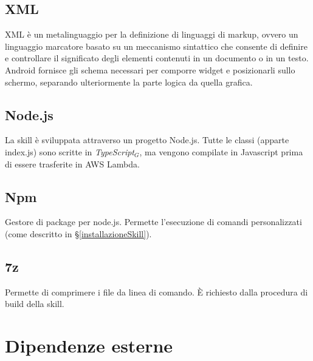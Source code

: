 \subsection{XML}
XML è un metalinguaggio per la definizione di linguaggi di markup, ovvero un linguaggio marcatore basato su un meccanismo sintattico che consente di definire e controllare il significato degli elementi contenuti in un documento o in un testo.\\ 
Android fornisce gli schema necessari per comporre widget e posizionarli sullo schermo, separando ulteriormente la parte logica da quella grafica. 

\subsection{Node.js}
La skill è sviluppata attraverso un progetto Node.js. Tutte le classi (apparte index.js) sono scritte in \textit{TypeScript$_{G}$}, ma vengono compilate in Javascript prima di essere trasferite in AWS Lambda.
\subsection{Npm}
Gestore di package per node.js. Permette l'esecuzione di comandi personalizzati (come descritto in \S\ref{installazioneSkill}).
\subsection{7z}
Permette di comprimere i file da linea di comando. \`{E} richiesto dalla procedura di build della skill.



\section{Dipendenze esterne}

